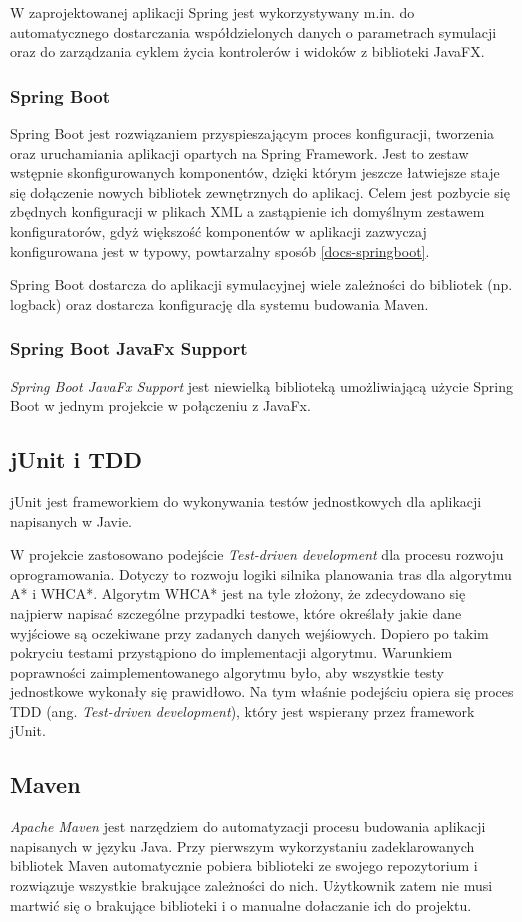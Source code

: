 W zaprojektowanej aplikacji Spring jest wykorzystywany m.in. do automatycznego dostarczania współdzielonych danych o parametrach symulacji oraz do zarządzania cyklem życia kontrolerów i widoków z biblioteki JavaFX.

\subsubsection{Spring Boot}
Spring Boot jest rozwiązaniem przyspieszającym proces konfiguracji, tworzenia oraz uruchamiania aplikacji opartych na Spring Framework.
Jest to zestaw wstępnie skonfigurowanych komponentów, dzięki którym jeszcze łatwiejsze staje się dołączenie nowych bibliotek zewnętrznych do aplikacj. Celem jest pozbycie się zbędnych konfiguracji w plikach XML a zastąpienie ich domyślnym zestawem konfiguratorów, gdyż większość komponentów w aplikacji zazwyczaj konfigurowana jest w typowy, powtarzalny sposób \ref{docs-springboot}.

Spring Boot dostarcza do aplikacji symulacyjnej wiele zależności do bibliotek (np. logback) oraz dostarcza konfigurację dla systemu budowania Maven.
\subsubsection{Spring Boot JavaFx Support}
{\it Spring Boot JavaFx Support} jest niewielką biblioteką umożliwiającą użycie Spring Boot w jednym projekcie w połączeniu z JavaFx.

\subsection{jUnit i TDD}
jUnit jest frameworkiem do wykonywania testów jednostkowych dla aplikacji napisanych w Javie.

W projekcie zastosowano podejście {\it Test-driven development} dla procesu rozwoju oprogramowania. Dotyczy to rozwoju logiki silnika planowania tras dla algorytmu A* i WHCA*. Algorytm WHCA* jest na tyle złożony, że zdecydowano się najpierw napisać szczególne przypadki testowe, które określały jakie dane wyjściowe są oczekiwane przy zadanych danych wejśiowych. Dopiero po takim pokryciu testami przystąpiono do implementacji algorytmu. Warunkiem poprawności zaimplementowanego algorytmu było, aby wszystkie testy jednostkowe wykonały się prawidłowo. Na tym właśnie podejściu opiera się proces TDD (ang. {\it Test-driven development}), który jest wspierany przez framework jUnit.

\subsection{Maven}
{\it Apache Maven} jest narzędziem do automatyzacji procesu budowania aplikacji napisanych w języku Java.
Przy pierwszym wykorzystaniu zadeklarowanych bibliotek Maven automatycznie pobiera biblioteki ze swojego repozytorium i rozwiązuje wszystkie brakujące zależności do nich. Użytkownik zatem nie musi martwić się o brakujące biblioteki i o manualne dołaczanie ich do projektu.

